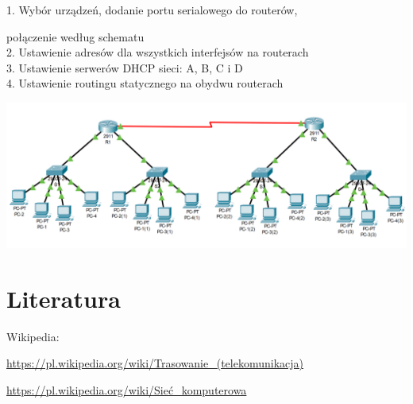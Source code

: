 \documentclass[12pt,a4paper]{article}
\begin{document}
1. Wybór urządzeń, dodanie portu serialowego do routerów,

połączenie według schematu \\
2. Ustawienie adresów dla wszystkich interfejsów na routerach \\
3. Ustawienie serwerów DHCP sieci: A, B, C i D \\
4. Ustawienie routingu statycznego na obydwu routerach \\

\begin{center}
\includegraphics[width=14cm]{schematPacket}
\end{center}

\newpage
\section{Literatura}
Wikipedia:

\url{https://pl.wikipedia.org/wiki/Trasowanie_(telekomunikacja)}

\url{https://pl.wikipedia.org/wiki/Sieć_komputerowa}
\end{document}
